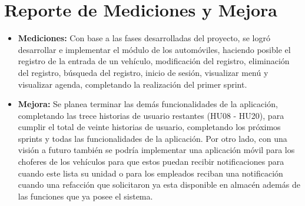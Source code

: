 \section{Reporte de Mediciones y Mejora}
\begin{itemize}
	\item \textbf{Mediciones: } Con base a las fases desarrolladas del proyecto, se logró desarrollar e implementar el módulo de los automóviles, haciendo posible el registro de la entrada de un vehículo, modificación del registro, eliminación del registro, búsqueda del registro, inicio de sesión, visualizar menú y visualizar agenda,  completando la realización del primer sprint.
	\item \textbf{Mejora: }Se planea terminar las demás funcionalidades de la aplicación, completando las trece historias de usuario restantes (HU08 - HU20), para cumplir el total de veinte historias de usuario, completando los próximos sprints y todas las funcionalidades de la aplicación. Por otro lado, con una visión a futuro también se podría implementar una aplicación móvil para los choferes de los vehículos para que estos puedan recibir notificaciones para cuando este lista su unidad o para los empleados reciban una notificación cuando una refacción que solicitaron ya esta disponible en almacén además de las funciones que ya posee el sistema. 
\end{itemize} 
